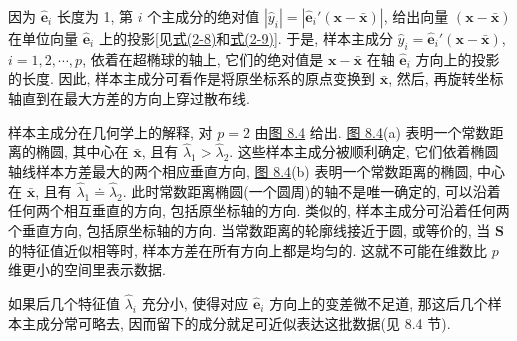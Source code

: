 因为 $\hat{\mathbf{e}}_i$ 长度为 1, 第 $i$ 个主成分的绝对值 $|\hat{y}_i|=|\hat{\mathbf{e}}_i'(\mathbf{x}-\bar{\mathbf{x}})|$, 给出向量 $(\mathbf{x}-\bar{\mathbf{x}})$ 在单位向量 $\hat{\mathbf{e}}_i$ 上的投影[见\hyperref[eq:2-8]{式(2-8)}和\hyperref[eq:2-9]{式(2-9)}]. 于是, 样本主成分 $\hat{y}_i=\hat{\mathbf{e}}_i'(\mathbf{x}-\bar{\mathbf{x}})$, $i=1,2,\cdots,p$, 依着在超椭球的轴上, 它们的绝对值是 $\mathbf{x}-\bar{\mathbf{x}}$ 在轴 $\hat{\mathbf{e}}_i$ 方向上的投影的长度. 因此, 样本主成分可看作是将原坐标系的原点变换到 $\bar{\mathbf{x}}$, 然后, 再旋转坐标轴直到在最大方差的方向上穿过散布线.

样本主成分在几何学上的解释, 对 $p=2$ 由\hyperref[fig:8.4]{图 8.4} 给出. \hyperref[fig:8.4]{图 8.4}(a) 表明一个常数距离的椭圆, 其中心在 $\bar{\mathbf{x}}$, 且有 $\hat{\lambda}_1>\hat{\lambda}_2$. 这些样本主成分被顺利确定, 它们依着椭圆轴线样本方差最大的两个相应垂直方向, \hyperref[fig:8.4]{图 8.4}(b) 表明一个常数距离的椭圆, 中心在 $\bar{\mathbf{x}}$, 且有 $\hat{\lambda}_1\doteq\hat{\lambda}_2$. 此时常数距离椭圆(一个圆周)的轴不是唯一确定的, 可以沿着任何两个相互垂直的方向, 包括原坐标轴的方向. 类似的, 样本主成分可沿着任何两个垂直方向, 包括原坐标轴的方向. 当常数距离的轮廓线接近于圆, 或等价的, 当 $\mathbf{S}$ 的特征值近似相等时, 样本方差在所有方向上都是均匀的. 这就不可能在维数比 $p$ 维更小的空间里表示数据.

如果后几个特征值 $\hat{\lambda}_i$ 充分小, 使得对应 $\hat{\mathbf{e}}_i$ 方向上的变差微不足道, 那这后几个样本主成分常可略去, 因而留下的成分就足可近似表达这批数据(见 8.4 节).

\begin{mvfigure}
\label{fig:8.3}
\end{mvfigure}
